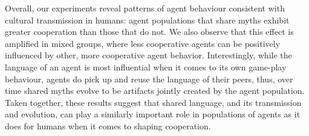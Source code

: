 
Overall, our experiments reveal patterns of agent behaviour consistent with cultural transmission in humans: agent populations that share myths exhibit greater cooperation than those that do not. We also observe that this effect is amplified in mixed groups, where less cooperative agents can be positively influenced by other, more cooperative agent behavior. 
Interestingly, while the language of an agent is most influential when it comes to its own game-play behaviour, agents do pick up and reuse the language of their peers, thus, over time shared myths evolve to be artifacts jointly created by the agent population. Taken together, these results suggest that shared language, and its transmission and evolution, can play a similarly important role in populations of agents as it does for humans when it comes to shaping cooperation. 


